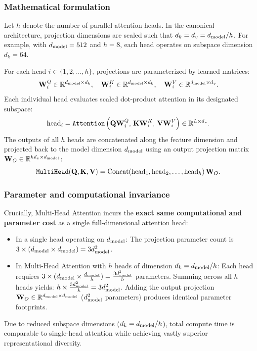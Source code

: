 \documentclass[../../../main.tex]{subfiles}
\begin{document}
\subsubsection{Mathematical formulation}
Let $h$ denote the number of parallel attention heads. In the canonical architecture, projection dimensions are scaled such that $d_k = d_v = d_{\text{model}} / h$. For example, with $d_{\text{model}} = 512$ and $h = 8$, each head operates on subspace dimension $d_k = 64$.

For each head $i \in \{1, 2, \dots, h\}$, projections are parameterized by learned matrices:
\begin{equation}
\label{eq:mha_head_matrices}
\mathbf{W}_i^Q \in \mathbb{R}^{d_{\text{model}} \times d_k}, \quad \mathbf{W}_i^K \in \mathbb{R}^{d_{\text{model}} \times d_k}, \quad \mathbf{W}_i^V \in \mathbb{R}^{d_{\text{model}} \times d_v}.
\end{equation}
Each individual head evaluates scaled dot-product attention in its designated subspace:
\begin{equation}
\label{eq:mha_head_i_def}
\text{head}_i = \text{\texttt{Attention}}\left( \mathbf{Q} \mathbf{W}_i^Q, \, \mathbf{K} \mathbf{W}_i^K, \, \mathbf{V} \mathbf{W}_i^V \right) \in \mathbb{R}^{L \times d_v}.
\end{equation}
The outputs of all $h$ heads are concatenated along the feature dimension and projected back to the model dimension $d_{\text{model}}$ using an output projection matrix $\mathbf{W}_O \in \mathbb{R}^{h d_v \times d_{\text{model}}}$:
\begin{equation}
\label{eq:mha_concat_projection}
\text{\texttt{MultiHead}}(\mathbf{Q}, \mathbf{K}, \mathbf{V}) = \text{Concat}(\text{head}_1, \text{head}_2, \dots, \text{head}_h) \, \mathbf{W}_O.
\end{equation}

\subsubsection{Parameter and computational invariance}
Crucially, Multi-Head Attention incurs the \textbf{exact same computational and parameter cost} as a single full-dimensional attention head:
\begin{itemize}
    \item In a single head operating on $d_{\text{model}}$:
    The projection parameter count is $3 \times (d_{\text{model}} \times d_{\text{model}}) = 3 d_{\text{model}}^2$.
    \item In Multi-Head Attention with $h$ heads of dimension $d_k = d_{\text{model}} / h$:
    Each head requires $3 \times (d_{\text{model}} \times \frac{d_{\text{model}}}{h}) = \frac{3 d_{\text{model}}^2}{h}$ parameters.
    Summing across all $h$ heads yields: $h \times \frac{3 d_{\text{model}}^2}{h} = 3 d_{\text{model}}^2$.
    Adding the output projection $\mathbf{W}_O \in \mathbb{R}^{d_{\text{model}} \times d_{\text{model}}}$ ($d_{\text{model}}^2$ parameters) produces identical parameter footprints.
\end{itemize}
Due to reduced subspace dimensions ($d_k = d_{\text{model}} / h$), total compute time is comparable to single-head attention while achieving vastly superior representational diversity.
\end{document}
